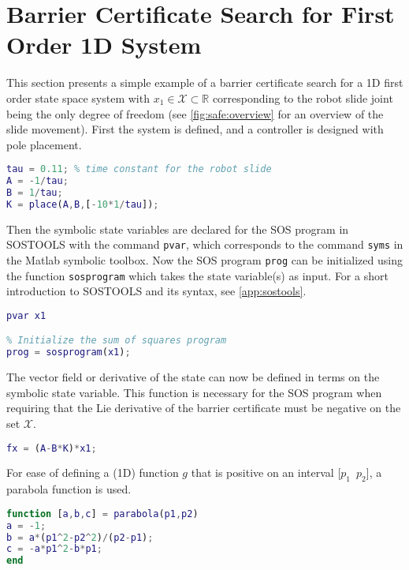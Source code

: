\section{Barrier Certificate Search for First Order 1D System}
This section presents a simple example of a barrier certificate search for a 1D first order state space system with $x_1\in\mathcal{X}\subset\mathbb{R}$ corresponding to the robot slide joint being the only degree of freedom (see \autoref{fig:safe:overview} for an overview of the slide movement). First the system is defined, and a controller is designed with pole placement.
\begin{lstlisting}[language=matlab]
% Define state-space system with x1 = robot position
tau = 0.11; % time constant for the robot slide
A = -1/tau;
B = 1/tau;
K = place(A,B,[-10*1/tau]);
\end{lstlisting}
Then the symbolic state variables are declared for the SOS program in SOSTOOLS with the command \texttt{pvar}, which corresponds to the command \texttt{syms} in the Matlab symbolic toolbox. Now the SOS program \texttt{prog} can be initialized using the function \texttt{sosprogram} which takes the state variable(s) as input. For a short introduction to SOSTOOLS and its syntax, see \autoref{app:sostools}.
\begin{lstlisting}[language=matlab]
% Declare state variables
pvar x1

% Initialize the sum of squares program
prog = sosprogram(x1);
\end{lstlisting}
The vector field or derivative of the state can now be defined in terms on the symbolic state variable. This function is necessary for the SOS program when requiring that the Lie derivative of the barrier certificate must be negative on the set $\mathcal{X}$.
\begin{lstlisting}[language=matlab]
% Vector field dx/dt = fx (closed loop)
fx = (A-B*K)*x1;
\end{lstlisting}
For ease of defining a (1D) function $g$ that is positive on an interval [$p_1\,\,\, p_2$], a parabola function is used.
\begin{lstlisting}[language=matlab]
function [a,b,c] = parabola(p1,p2)
a = -1;
b = a*(p1^2-p2^2)/(p2-p1);
c = -a*p1^2-b*p1;
end
\end{lstlisting}
